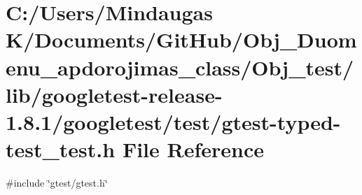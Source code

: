\hypertarget{_obj__test_2lib_2googletest-release-1_88_81_2googletest_2test_2gtest-typed-test__test_8h}{}\section{C\+:/\+Users/\+Mindaugas K/\+Documents/\+Git\+Hub/\+Obj\+\_\+\+Duomenu\+\_\+apdorojimas\+\_\+class/\+Obj\+\_\+test/lib/googletest-\/release-\/1.8.1/googletest/test/gtest-\/typed-\/test\+\_\+test.h File Reference}
\label{_obj__test_2lib_2googletest-release-1_88_81_2googletest_2test_2gtest-typed-test__test_8h}
{\ttfamily \#include \char`\"{}gtest/gtest.\+h\char`\"{}}\newline
